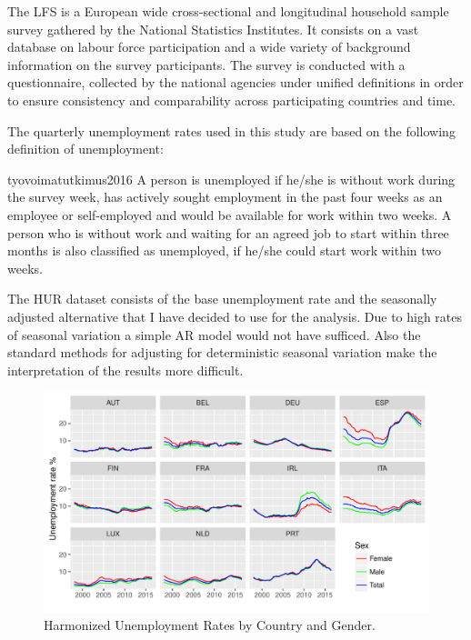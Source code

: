 \documentclass[12pt,a4paper,english]{article}
\begin{document}
The LFS is a European wide cross-sectional and longitudinal household sample survey gathered by the National Statistics Institutes. It consists on a vast database on labour force participation and a wide variety of background information on the survey participants. The survey is conducted with a questionnaire, collected by the national agencies under unified definitions in order to ensure consistency and comparability across participating countries and time. \citep{eurostat2009}

The quarterly unemployment rates used in this study are based on the following definition of unemployment: 

\begin{displaycquote}{tyovoimatutkimus2016}
	A person is unemployed if he/she is without work during the survey week, has actively sought employment in the past four weeks as an employee or self-employed and would be available for work within two weeks. A person who is without work and waiting for an agreed job to start within three months is also classified as unemployed, if he/she could start work within two weeks.
\end{displaycquote}

The HUR dataset consists of the base unemployment rate and the seasonally adjusted alternative that I have decided to use for the analysis. Due to high rates of seasonal variation a simple AR model would not have sufficed. Also the standard methods for adjusting for deterministic seasonal variation make the interpretation of the results more difficult.

\begin{figure}
\vspace{1.5cm}
\centering
\includegraphics[width=0.9\linewidth]{Graphs/STSA_FE_MA_TT_facet}
\caption{Harmonized Unemployment Rates by Country and Gender.\cite{oecdSTLABOUR}}
\label{fig:stsafemattfacet}
\vspace{1.5cm}
\end{figure}
\end{document}
